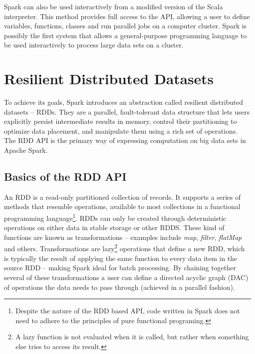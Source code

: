 \documentclass{l4proj}
\begin{document}
Spark can also be used interactively from a modified version of the Scala interpreter. This method provides full access to the API, allowing a user to define variables, functions, classes and run parallel jobs on a computer cluster. Spark is possibly the first system that allows a general-purpose programming language to be used interactively to process large data sets on a cluster\cite{Spark}.

\section{Resilient Distributed Datasets}

To achieve its goals, Spark introduces an abstraction called resilient distributed datasets -- RDDs. They are a parallel, fault-tolerant data structure that lets users explicitly persist intermediate results in memory, control their partitioning to optimize data placement, and manipulate them using a rich set of operations\cite{RDD}. The RDD API is the primary way of expressing computation on big data sets in Apache Spark.

\subsection{Basics of the RDD API}

An RDD is a read-only partitioned collection of records. It supports a series of methods that resemble operations, available to most collections in a functional programming language\footnote{Despite the nature of the RDD based API, code written in Spark does not need to adhere to the principles of pure functional programing.}. RDDs can only be created through deterministic operations on either data in stable storage or other RDDS. These kind of functions are known as transformations -- examples include \textit{map}, \textit{filter}, \textit{flatMap} and others. Transformations are lazy\footnote{A lazy function is not evaluated when it is called, but rather when something else tries to access its result.} operations that define a new RDD, which is typically the result of applying the same function to every data item in the source RDD -- making Spark ideal for batch processing. By chaining together several of these transformations a user can define a directed acyclic graph (DAC) of operations the data needs to pass through (achieved in a parallel fashion).
\end{document}
